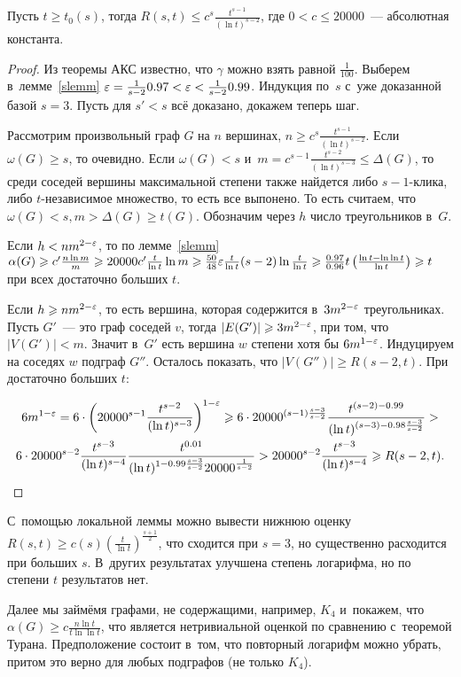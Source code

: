 \documentclass{article}
\begin{document}
\begin{theorem}
	Пусть $t \ge t_0(s)$, тогда $R(s, t) \le c^s \frac{t^{s-1}}{(\ln t)^{s-2}}$,
	где $0 < c \le 20000$~--- абсолютная константа.
\end{theorem}
\begin{proof}
	Из теоремы АКС известно, что $\gamma$ можно взять равной $\frac{1}{100}$.
	Выберем в~лемме~\ref{slemm} $\varepsilon = \frac{1}{s - 2} 0.97 < \varepsilon < \frac{1}{s -
	2} 0.99$. Индукция по~$s$ с~уже доказанной базой $s = 3$. Пусть для $s' < s$
	всё доказано, докажем теперь шаг.

	Рассмотрим произвольный граф $G$ на $n$ вершинах, $n \ge c^s
	\frac{t^{s-1}}{(\ln t)^{s-2}}$. Если $\omega(G) \ge s$, то очевидно.
	Если $\omega(G) < s$ и~$m = c^{s-1}\frac{t^{s-2}}{(\ln t)^{s-3}} \le
	\Delta(G)$, то среди соседей вершины максимальной степени также найдется либо
	$s - 1$-клика, либо $t$-независимое множество, то есть все выпонено. То есть
	считаем, что $\omega(G) < s, m > \Delta(G) \ge t(G)$.  Обозначим через $h$
	число треугольников в~$G$.

	Если $h < n m^{2-\varepsilon}$, то по лемме~\ref{slemm} $\alpha(G) \geqslant c' \frac{n \ln
	m}{m} \geqslant 20000c' \frac{t}{\ln t} \ln m \geqslant \frac{50}{48} \varepsilon \frac{t}{\ln t}
	(s - 2) \ln \frac{t}{\ln t} \geqslant \frac{0.97}{0.96} t \left( \frac{\ln t - \ln
	\ln t}{\ln t}\right) \geqslant t$ при всех достаточно больших $t$.

	Если $h \geqslant n m^{2 - \varepsilon}$, то есть вершина, которая содержится в~$3
	m^{2-\varepsilon}$ треугольниках. Пусть $G'$~--- это граф соседей $v$, тогда $|E(G')|
	\geqslant 3m^{2 - \varepsilon}$, при том, что $|V(G')| < m$. Значит в~$G'$ есть вершина $w$
	степени хотя бы $6 m^{1-\varepsilon}$. Индуцируем на соседях $w$ подграф $G''$.
	Осталось показать, что $|V(G'')| \ge R(s - 2, t)$. При достаточно больших $t$:

	\begin{multline*}
		6 m^{1-\varepsilon} = 6 \cdot \left( 20000^{s-1} \frac{t^{s-2}}{(\ln
		t)^{s-3}}\right)^{1-\varepsilon} \geqslant 6 \cdot 20000^{(s-1)\frac{s-3}{s-2}}
		\frac{t^{(s-2)-0.99}}{(\ln t)^{(s-3)-0.98\frac{s-3}{s-2}}}>\\
		6 \cdot 20000^{s-2} \frac{t^{s-3}}{(\ln t)^{s-4}} \frac{t^{0.01}}{(\ln t)^{1
		- 0.99 \frac{s-3}{s-2}} 20000^{\frac{1}{s-2}}} > 20000^{s-2}
		\frac{t^{s-3}}{(\ln t)^{s-4}} \geqslant R(s - 2, t).
	\end{multline*}
\end{proof}

С~помощью локальной леммы можно вывести нижнюю оценку $R(s, t) \ge c(s) \left(
\frac{t}{\ln t}\right)^\frac{s+1}{2}$, что сходится при $s = 3$, но существенно
расходится при больших $s$. В~других результатах улучшена степень логарифма, но
по степени $t$ результатов нет.

Далее мы займёмя графами, не содержащими, например, $K_4$ и~покажем, что
$\alpha(G) \ge c \frac{n \ln t}{t \ln \ln t}$, что является нетривиальной
оценкой по сравнению с~теоремой Турана. Предположение состоит в~том, что
повторный логарифм можно убрать, притом это верно для любых подграфов (не только
$K_4$).
\end{document}
